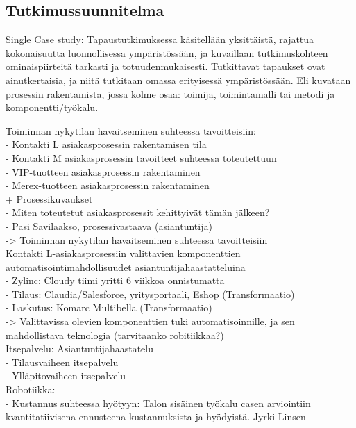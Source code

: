 \documentclass[finnish,12pt,a4paper,pdftex]{article}
\begin{document}
\subsection{Tutkimussuunnitelma}

Single Case study: Tapaustutkimuksessa käsitellään yksittäistä, rajattua kokonaisuutta luonnollisessa ympäristössään, ja kuvaillaan tutkimuskohteen ominaispiirteitä tarkasti ja totuudenmukaisesti. Tutkittavat tapaukset ovat ainutkertaisia, ja niitä tutkitaan omassa erityisessä ympäristössään. Eli kuvataan prosessin rakentamista, jossa kolme osaa: toimija, toimintamalli tai metodi ja komponentti/työkalu.

Toiminnan nykytilan havaitseminen suhteessa tavoitteisiin:\\
- Kontakti L asiakasprosessin rakentamisen tila\\
- Kontakti M asiakasprosessin tavoitteet suhteessa toteutettuun\\
- VIP-tuotteen asiakasprosessin rakentaminen\\
- Merex-tuotteen asiakasprosessin rakentaminen\\
+ Prosessikuvaukset\\
- Miten toteutetut asiakasprosessit kehittyivät tämän jälkeen?\\
- Pasi Savilaakso, prosessivastaava (asiantuntija)\\
-> Toiminnan nykytilan havaitseminen suhteessa tavoitteisiin\\

Kontakti L-asiakasprosessiin valittavien komponenttien automatisointimahdollisuudet asiantuntijahaastatteluina\\
- Zylinc: Cloudy tiimi yritti 6 viikkoa onnistumatta\\
- Tilaus: Claudia/Salesforce, yritysportaali, Eshop (Transformaatio)\\
- Laskutus: Komarc Multibella (Transformaatio)\\
-> Valittavissa olevien komponenttien tuki automatisoinnille, ja sen mahdollistava teknologia (tarvitaanko robitiikkaa?)\\

Itsepalvelu: Asiantuntijahaastatelu\\
- Tilausvaiheen itsepalvelu\\
- Ylläpitovaiheen itsepalvelu\\

Robotiikka:\\
- Kustannus suhteessa hyötyyn: Talon sisäinen työkalu casen arviointiin kvantitatiivisena ennusteena kustannuksista ja hyödyistä. Jyrki Linsen
\end{document}
